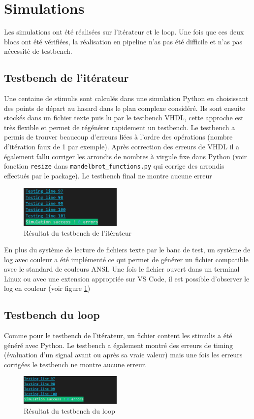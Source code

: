 \documentclass[LPSC_Labo03_SDeriaz]{subfiles}
\begin{document}
\section{Simulations}
Les simulations ont été réalisées sur l'itérateur et le loop. Une fois que ces deux blocs ont été vérifiées, la réalisation en pipeline n'as pas été difficile et n'as pas nécessité de testbench.
\subsection{Testbench de l'itérateur}
Une centaine de stimulis sont calculés dans une simulation Python en choisissant des points de départ au hasard dans le plan complexe considéré. Ils sont ensuite stockés dans un fichier texte puis lu par le testbench VHDL, cette approche est très flexible et permet de régénérer rapidement un testbench. Le testbench a permis de trouver beaucoup d'erreurs liées à l'ordre des opérations (nombre d'itération faux de 1 par exemple). Après correction des erreurs de VHDL il a également fallu corriger les arrondis de nombres à virgule fixe dans Python (voir fonction \verb!resize! dans \verb!mandelbrot_functions.py! qui corrige des arrondis effectués par le package). Le testbench final ne montre aucune erreur
\begin{figure}[H]
\centering
\includegraphics[width=5cm]{testbench_iteration.png}
\caption{Résultat du testbench de l'itérateur}
\label{fig_testbench_iteration}
\end{figure}
En plus du système de lecture de fichiers texte par le banc de test, un système de log avec couleur a été implémenté ce qui permet de générer un fichier compatible avec le standard de couleurs ANSI. Une fois le fichier ouvert dans un terminal Linux ou avec une extension appropriée sur VS Code, il est possible d'observer le log en couleur (voir figure \ref{fig_testbench_iteration})
\subsection{Testbench du loop}
Comme pour le testbench de l'itérateur, un fichier content les stimulis a été généré avec Python. Le testbench a également montré des erreurs de timing (évaluation d'un signal avant ou après sa vraie valeur) mais une fois les erreurs corrigées le testbench ne montre aucune erreur.
\begin{figure}[H]
\centering
\includegraphics[width=5cm]{testbench_loop.png}
\caption{Résultat du testbench du loop}
\end{figure}
\end{document}
